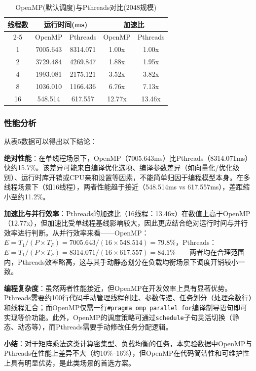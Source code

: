 \documentclass{SYSUReport}
\begin{document}
\begin{table}[H]
\centering
\caption{OpenMP(默认调度)与Pthreads对比(2048规模)}
\label{表5}
\begin{tabular}{|c|c|c|c|c|}
\hline
\multirow{2}{*}{线程数} & \multicolumn{2}{c|}{运行时间(ms)} & \multicolumn{2}{c|}{加速比} \\ \cline{2-5}
 & OpenMP & Pthreads & OpenMP & Pthreads \\ \hline
1  & 7005.643 & 8314.071 & 1.00x & 1.00x \\ \hline
2  & 3729.484 & 4269.847 & 1.88x & 1.95x \\ \hline
4  & 1993.081 & 2175.121 & 3.52x & 3.82x \\ \hline
8  & 1036.010 & 1166.436 & 6.76x & 7.13x \\ \hline
16 & 548.514 & 617.557 & 12.77x & 13.46x \\ \hline
\end{tabular}
\end{table}

\subsubsection{性能分析}

从表5数据可以得出以下结论：

\textbf{绝对性能}：在单线程场景下，OpenMP（7005.643ms）比Pthreads（8314.071ms）快约15.7\%。该差异可能来自编译优化选项、编译参数差异（如向量化/优化级别）、运行时库开销或CPU亲和设置等因素，不能简单归因于编程模型本身。在多线程场景下（如16线程），两者性能趋于接近（548.514ms vs 617.557ms），差距缩小至约11.2\%。

\textbf{加速比与并行效率}：Pthreads的加速比（16线程：13.46x）在数值上高于OpenMP（12.77x），但加速比受单线程基线影响较大，因此更应结合绝对运行时间与并行效率进行判断。从并行效率来看——OpenMP：$E=T_1/(P\times T_P)=7005.643/(16\times548.514)=79.8\%$，Pthreads：$E=T_1/(P\times T_P)=8314.071/(16\times617.557)=84.1\%$——两者均在合理范围内，Pthreads效率略高，这与其手动静态划分在负载均衡场景下调度开销较小一致。

\textbf{编程复杂度}：虽然两者性能接近，但OpenMP在开发效率上具有显著优势。Pthreads需要约100行代码手动管理线程创建、参数传递、任务划分（处理余数行）和线程汇合；而OpenMP仅需一行\texttt{\#pragma omp parallel for}编译制导语句即可实现等价功能。此外，OpenMP的调度策略可通过\texttt{schedule}子句灵活切换（静态、动态等），而Pthreads需要手动修改任务分配逻辑。

\textbf{小结}：对于矩阵乘法这类计算密集型、负载均衡的任务，本实验数据中OpenMP与Pthreads在性能上差异不大（约10\%--16\%），但OpenMP在代码简洁性和可维护性上具有明显优势，是此类场景的首选方案。
\end{document}
